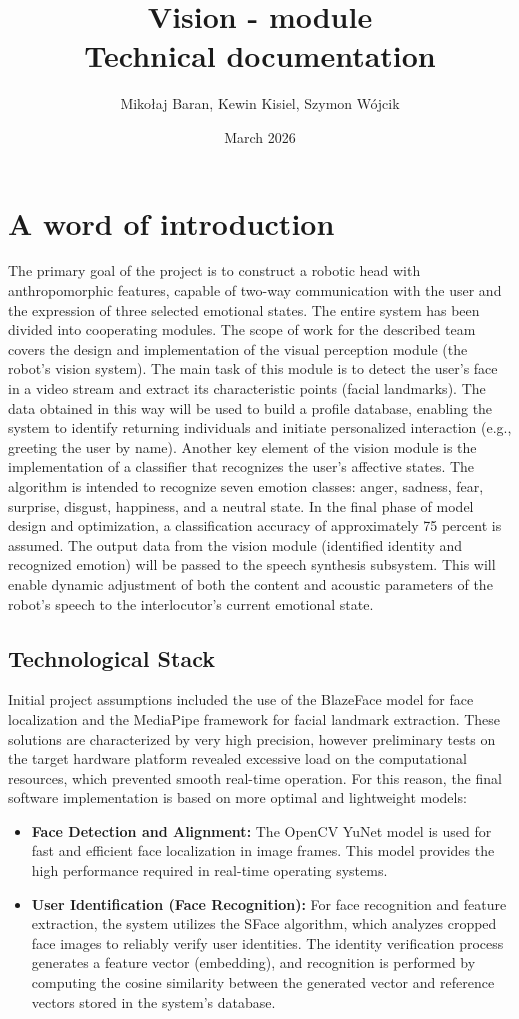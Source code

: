 \documentclass{article}
\title{Vision - module\\[1ex]
\large Technical documentation}
\author{Mikołaj Baran, Kewin Kisiel, Szymon Wójcik}
\date{March 2026}
\begin{document}
\maketitle

\tableofcontents
\newpage
\section{A word of introduction}
The primary goal of the project is to construct a robotic head with anthropomorphic features, capable of two-way communication with the user and the expression of three selected emotional states. The entire system has been divided into cooperating modules.
The scope of work for the described team covers the design and implementation of the visual perception module (the robot's vision system). The main task of this module is to detect the user's face in a video stream and extract its characteristic points (facial landmarks). The data obtained in this way will be used to build a profile database, enabling the system to identify returning individuals and initiate personalized interaction (e.g., greeting the user by name).
Another key element of the vision module is the implementation of a classifier that recognizes the user's affective states. The algorithm is intended to recognize seven emotion classes: anger, sadness, fear, surprise, disgust, happiness, and a neutral state. In the final phase of model design and optimization, a classification accuracy of approximately 75 percent is assumed.
The output data from the vision module (identified identity and recognized emotion) will be passed to the speech synthesis subsystem. This will enable dynamic adjustment of both the content and acoustic parameters of the robot's speech to the interlocutor's current emotional state.
\subsection{Technological Stack}
Initial project assumptions included the use of the BlazeFace \cite{blazeface} model for face localization and the MediaPipe \cite{mediapipe} framework for facial landmark extraction. These solutions are characterized by very high precision, however preliminary tests on the target hardware platform revealed excessive load on the computational resources, which prevented smooth real-time operation. For this reason, the final software implementation is based on more optimal and lightweight models:

\begin{itemize}
	\item \textbf{Face Detection and Alignment:} The OpenCV YuNet model is used for fast and efficient face localization in image frames. This model provides the high performance required in real-time operating systems.
	\item \textbf{User Identification (Face Recognition):} For face recognition and feature extraction, the system utilizes the SFace algorithm, which analyzes cropped face images to reliably verify user identities. The identity verification process generates a feature vector (embedding), and recognition is performed by computing the cosine similarity between the generated vector and reference vectors stored in the system's database.
\end{itemize}
\end{document}
